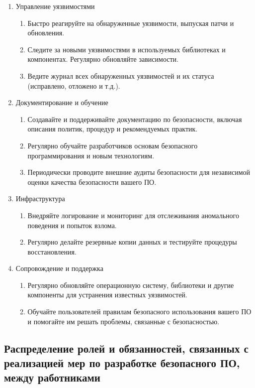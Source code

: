 \begin{enumerate}
    \item Управление уязвимостями
    \begin{enumerate}
        \item Быстро реагируйте на обнаруженные уязвимости, выпуская патчи и обновления.
        \item Следите за новыми уязвимостями в используемых библиотеках и компонентах. Регулярно обновляйте зависимости.
        \item Ведите журнал всех обнаруженных уязвимостей и их статуса (исправлено, отложено и т.д.).
    \end{enumerate}

    \item Документирование и обучение
    \begin{enumerate}
        \item Создавайте и поддерживайте документацию по безопасности, включая описания политик, процедур и рекомендуемых практик.
        \item Регулярно обучайте разработчиков основам безопасного программирования и новым технологиям.
        \item Периодически проводите внешние аудиты безопасности для независимой оценки качества безопасности вашего ПО.
    \end{enumerate}

    \item Инфраструктура
    \begin{enumerate}
        \item Внедряйте логирование и мониторинг для отслеживания аномального поведения и попыток взлома.
        \item Регулярно делайте резервные копии данных и тестируйте процедуры восстановления.
    \end{enumerate}

    \item Сопровождение и поддержка
    \begin{enumerate}
        \item Регулярно обновляйте операционную систему, библиотеки и другие компоненты для устранения известных уязвимостей.
        \item Обучайте пользователей правилам безопасного использования вашего ПО и помогайте им решать проблемы, связанные с безопасностью.
    \end{enumerate}
\end{enumerate}

\subsection{Распределение ролей и обязанностей, связанных с реализацией мер по разработке безопасного ПО, между работниками}

